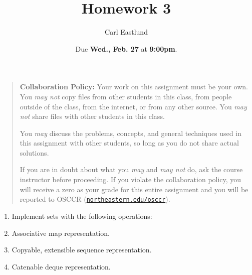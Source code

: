 \documentclass{article}
\title{Homework 3}
\author{Carl Eastlund}
\date{Due \textbf{Wed., Feb. 27} at \textbf{9:00pm}.}
\begin{document}
\maketitle

\newcommand\link[2][http://]{\href{#1#2}{\nolinkurl{#2}}}
\newcommand\http[1]{\link[http://]{#1}}
\newcommand\https[1]{\link[https://]{#1}}
\newcommand\email[1]{\link[mailto:]{#1}}

\begin{quotation}

  \noindent \textbf{Collaboration Policy:} Your work on this assignment must be
  your own.  You \emph{may not} copy files from other students in this class,
  from people outside of the class, from the internet, or from any other source.
  You \emph{may not} share files with other students in this class.

  \medskip

  \noindent You \emph{may} discuss the problems, concepts, and general
  techniques used in this assignment with other students, so long as you do not
  share actual solutions.

  \medskip

  \noindent If you are in doubt about what you \emph{may} and \emph{may not} do,
  ask the course instructor before proceeding.  If you violate the collaboration
  policy, you will receive a zero as your grade for this entire assignment and
  you will be reported to OSCCR (\link{northeastern.edu/osccr}).

\end{quotation}

\bigskip

\newcommand\code[1]{\mbox{\texttt{#1}}}
\newcommand\hastype{\ensuremath{:~}}
\newcommand\type[1]{\ensuremath{\mathit{#1}}}
\newcommand\Bool{\type{Boolean}}
\newcommand\Num{\type{Number}}
\newcommand\Set{\type{Set}}

\begin{enumerate}

\item Implement sets with the following operations:

\item Associative map representation.

\item Copyable, extensible sequence representation.

\item Catenable deque representation.

\end{enumerate}
\end{document}
